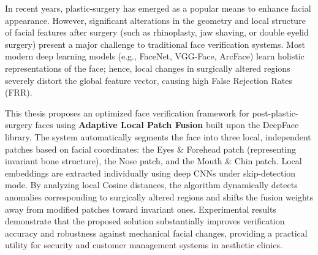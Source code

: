 \begin{sloppypar}
In recent years, plastic-surgery has emerged as a popular means to enhance facial appearance. However, significant alterations in the geometry and local structure of facial features after surgery (such as rhinoplasty, jaw shaving, or double eyelid surgery) present a major challenge to traditional face verification systems. Most modern deep learning models (e.g., FaceNet, VGG-Face, ArcFace) learn holistic representations of the face; hence, local changes in surgically altered regions severely distort the global feature vector, causing high False Rejection Rates (FRR).

This thesis proposes an optimized face verification framework for post-plastic-surgery faces using \textbf{Adaptive Local Patch Fusion} built upon the DeepFace library. The system automatically segments the face into three local, independent patches based on facial coordinates: the Eyes \& Forehead patch (representing invariant bone structure), the Nose patch, and the Mouth \& Chin patch. Local embeddings are extracted individually using deep CNNs under skip-detection mode. By analyzing local Cosine distances, the algorithm dynamically detects anomalies corresponding to surgically altered regions and shifts the fusion weights away from modified patches toward invariant ones. Experimental results demonstrate that the proposed solution substantially improves verification accuracy and robustness against mechanical facial changes, providing a practical utility for security and customer management systems in aesthetic clinics.
\end{sloppypar}

\newpage
\cleardoublepage